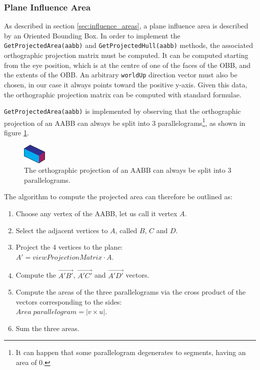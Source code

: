 \documentclass[acmtog, anonymous, review]{acmart}
\begin{document}
\subsubsection{Plane Influence Area}
As described in section \ref{sec:influence_areas}, a plane influence area is described by an Oriented Bounding Box. In order to implement the \texttt{GetProjectedArea(aabb)} and \texttt{GetProjectedHull(aabb)} methods, the associated orthographic projection matrix must be computed. It can be computed starting from the eye position, which is at the centre of one of the faces of the OBB, and the extents of the OBB. An arbitrary \texttt{worldUp} direction vector must also be chosen, in our case it always points toward the positive y-axis. Given this data, the orthographic projection matrix can be computed with standard formulae.

\texttt{GetProjectedArea(aabb)} is implemented by observing that the orthographic projection of an AABB can always be split into 3 parallelograms\footnote{It can happen that some parallelogram degenerates to segments, having an area of 0.}, as shown in figure \ref{fig:parallelograms}.

\begin{figure}[H]
  \centering
  \includegraphics[width=0.1\textwidth]{Images/parallelograms.png}
  \caption{The orthographic projection of an AABB can always be split into 3 parallelograms.}
  \label{fig:parallelograms} 
\end{figure}

The algorithm to compute the projected area can therefore be outlined as:

\begin{enumerate}
	\item Choose any vertex of the AABB, let us call it vertex $A$.
	\item Select the adjacent vertices to $A$, called $B$, $C$ and $D$.
	\item Project the 4 vertices to the plane: \\$A' = viewProjectionMatrix \cdot A$.
	\item Compute the $\overrightarrow{A'B'}$, $\overrightarrow{A'C'}$ and $\overrightarrow{A'D'}$ vectors.
	\item Compute the areas of the three parallelograms via the cross product of the vectors corresponding to the sides: \\$Area\; parallelogram = |v \times u|$.
	\item Sum the three areas.
\end{enumerate}
\end{document}

